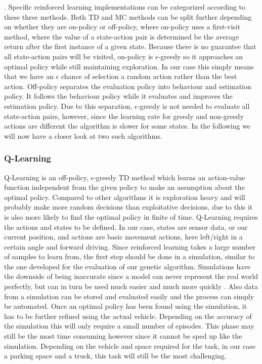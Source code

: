 \cite{9}. Specific reinforced learning implementations can be categorized according to these three methods. Both TD and MC methods can be split further depending on whether they are on-policy or off-policy, where on-policy uses a first-visit method, where the value of a state-action pair is determined be the average return after the first instance of a given state. Because there is no guarantee that all state-action pairs will be visited, on-policy is $\epsilon$-greedy so it approaches an optimal policy while still maintaining exploration. In our case this simply means that we have an $\epsilon$ chance of selection a random action rather than the best action. Off-policy separates the evaluation policy into behaviour and estimation policy. It follows the behaviour policy while it evaluates and improves the estimation policy. Due to this separation, $\epsilon$-greedy is not needed to evaluate all state-action pairs, however, since the learning rate for greedy and non-greedy actions are different the algorithm is slower for some states. 
In the following we will now have a closer look at two such algorithms.

\subsubsection{Q-Learning}
\label{sec:q-learning}

Q-Learning is an off-policy, $\epsilon$-greedy TD method which learns an action-value function independent from the given policy to make an assumption about the optimal policy. Compared to other algorithms it is exploration heavy and will probably make more random decisions than exploitative decisions, due to this it is also more likely to find the optimal policy in finite of time. Q-Learning requires the actions and states to be defined. In our case, states are sensor data, or our current position, and actions are basic movement actions, here left/right in a certain angle and forward driving. Since reinforced learning takes a large number of samples to learn from, the first step should be done in a simulation, similar to the one developed for the evaluation of our genetic algorithm. Simulations have the downside of being inaccurate since a model can never represent the real world perfectly, but can in turn be used much easier and much more quickly \cite{9}. Also data from a simulation can be stored and evaluated easily and the process can simply be automated. Once an optimal policy has been found using the simulation, it has to be further refined using the actual vehicle. Depending on the accuracy of the simulation this will only require a small number of episodes. This phase may still be the most time consuming however since it cannot be sped up like the simulation. Depending on the vehicle and space required for the task, in our case a parking space and a truck, this task will still be the most challenging.

